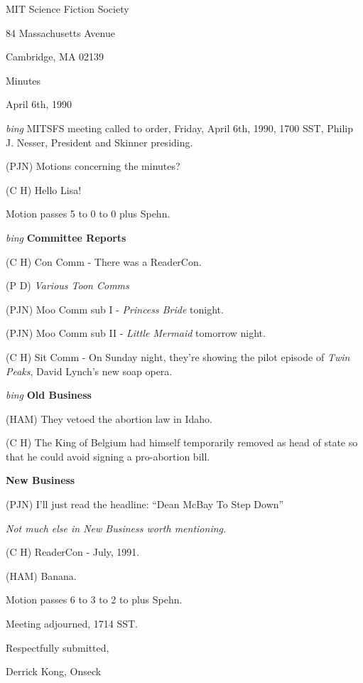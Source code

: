 \setlength{\topmargin}{-0.5in}
\setlength{\oddsidemargin}{0.0in}
\setlength{\evensidemargin}{0.0in}
\setlength{\textheight}{9in}
\setlength{\textwidth}{6.5in}



\begin{center}
MIT Science Fiction Society

84 Massachusetts Avenue

Cambridge, MA 02139

\vspace{0.2in}
Minutes

April 6th, 1990

\end{center}
 
\vspace{0.15in}
{\em bing\/}  MITSFS meeting called to order, Friday, April 6th, 1990,
1700 SST, Philip J. Nesser, President and Skinner presiding.

(PJN) Motions concerning the minutes?

(C H) Hello Lisa!

Motion passes 5 to 0 to 0 plus Spehn.

\vspace{0.15in}
{\em bing\/} {\bf Committee Reports}

(C H) Con Comm - There was a ReaderCon.

(P D) {\em Various Toon Comms}

(PJN) Moo Comm sub I - {\em Princess Bride} tonight.

(PJN) Moo Comm sub II - {\em Little Mermaid} tomorrow night.

(C H) Sit Comm - On Sunday night, they're showing the pilot episode of
{\em Twin Peaks}, David Lynch's new soap opera.

\vspace{0.15in}
{\em bing\/} {\bf Old Business}

(HAM) They vetoed the abortion law in Idaho.

(C H) The King of Belgium had himself temporarily removed as head of
state so that he could avoid signing a pro-abortion bill.

\vspace{0.15in}
{\bf New Business}

(PJN) I'll just read the headline: ``Dean McBay To Step Down''

{\em Not much else in New Business worth mentioning.}

(C H) ReaderCon - July, 1991.

(HAM) Banana.

Motion passes 6 to 3 to 2 to plus Spehn.

Meeting adjourned, 1714 SST. 

\vspace{0.15in}
\begin{center}
Respectfully submitted,

Derrick Kong, Onseck
\end{center}

